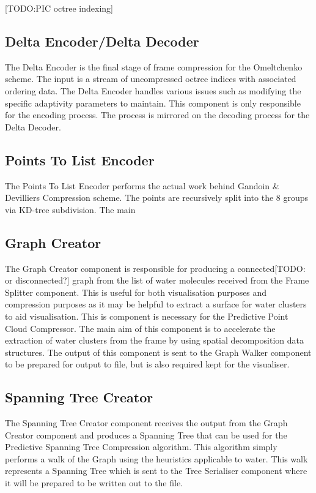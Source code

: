 \documentclass[a4paper,11pt]{report}
\begin{document}
[TODO:PIC octree indexing]

\subsection{Delta Encoder/Delta Decoder}

The Delta Encoder is the final stage of frame compression for the Omeltchenko scheme. The input is a stream of uncompressed octree indices with associated ordering data. The Delta Encoder handles various issues such as modifying the specific adaptivity parameters to maintain. This component is only responsible for the encoding process. The process is mirrored on the decoding process for the Delta Decoder.

\subsection{Points To List Encoder}

The Points To List Encoder performs the actual work behind Gandoin \& Devilliers Compression scheme. The points are recursively split into the 8 groups via KD-tree subdivision. The main 

\subsection{Graph Creator}

The Graph Creator component is responsible for producing a connected[TODO: or disconnected?] graph from the list of water molecules received from the Frame Splitter component. This is useful for both visualisation purposes and compression purposes as it may be helpful to extract a surface for water clusters to aid visualisation. This is component is necessary for the Predictive Point Cloud Compressor. The main aim of this component is to accelerate the extraction of water clusters from the frame by using spatial decomposition data structures. The output of this component is sent to the Graph Walker component to be prepared for output to file, but is also required kept for the visualiser. 

\subsection{Spanning Tree Creator}

The Spanning Tree Creator component receives the output from the Graph Creator component and produces a Spanning Tree that can be used for the Predictive Spanning Tree Compression algorithm. This algorithm simply performs a walk of the Graph using the heuristics applicable to water. This walk represents a Spanning Tree which is sent to the Tree Serialiser component where it will be prepared to be written out to the file.
\end{document}
